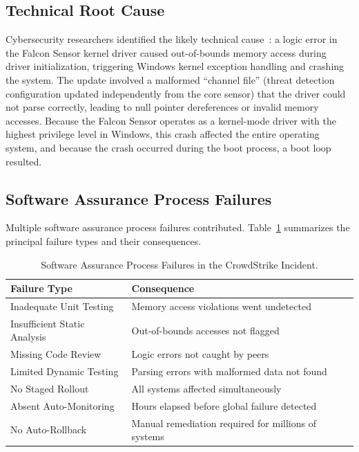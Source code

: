 \documentclass[sigconf,nonacm]{acmart}
\begin{document}
\subsection{Technical Root Cause}

Cybersecurity researchers identified the likely technical cause~\cite{siddiqui2024crowdstrike}:
a logic error in the Falcon Sensor kernel driver caused out-of-bounds memory
access during
driver initialization, triggering Windows kernel exception handling and crashing the system.
The update involved a malformed ``channel file'' (threat detection configuration updated
independently from the core sensor) that the driver could not parse correctly, leading to
null pointer dereferences or invalid memory accesses. Because the Falcon Sensor operates as
a kernel-mode driver with the highest privilege level in Windows, this crash affected the
entire operating system, and because the crash occurred during the boot process, a boot loop
resulted.

\subsection{Software Assurance Process Failures}

Multiple software assurance process failures contributed. Table~\ref{tab:failures}
summarizes the principal failure types and their consequences.

\begin{table}[h]
\caption{Software Assurance Process Failures in the CrowdStrike Incident.}
\label{tab:failures}
\small
\begin{tabularx}{\columnwidth}{@{}p{2.6cm}X@{}}
\toprule
\textbf{Failure Type} & \textbf{Consequence} \\
\midrule
Inadequate Unit Testing  & Memory access violations went undetected \\
\addlinespace[2pt]
Insufficient Static Analysis & Out-of-bounds accesses not flagged \\
\addlinespace[2pt]
Missing Code Review & Logic errors not caught by peers \\
\addlinespace[2pt]
Limited Dynamic Testing & Parsing errors with malformed data not found \\
\addlinespace[2pt]
No Staged Rollout & All systems affected simultaneously \\
\addlinespace[2pt]
Absent Auto-Monitoring & Hours elapsed before global failure detected \\
\addlinespace[2pt]
No Auto-Rollback & Manual remediation required for millions of systems \\
\bottomrule
\end{tabularx}
\end{table}
\end{document}
